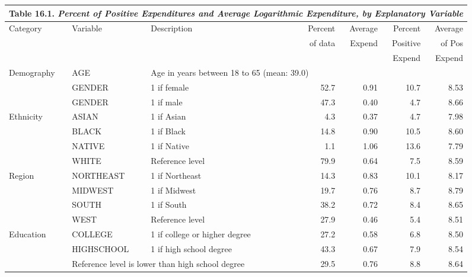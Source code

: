 \clearpage

\begin{table}
\begin{center}
\begin{tabular}{lllrrrr}
\multicolumn{7}{c}{Table 16.1. \textit{Percent of Positive
Expenditures
and Average Logarithmic Expenditure, by Explanatory Variable}} \\
\hline
Category & Variable & Description & Percent & Average & Percent & Average \\
&  &  & of data & \multicolumn{1}{r}{Expend} & \multicolumn{1}{r}{Positive}
& of Pos \\
&  &  &  & \multicolumn{1}{r}{} & \multicolumn{1}{r}{Expend} & Expend \\
\hline Demography &        AGE &  \multicolumn{2}{l}{Age in years
between
18  to 65 (mean: 39.0)}          \\
           &     GENDER & 1 if female &       52.7 &       0.91 &       10.7 &       8.53 \\
           &     GENDER &  1 if male &       47.3 &       0.40 &       4.7 &       8.66 \\
 Ethnicity &      ASIAN & 1 if Asian &        4.3 &       0.37 &        4.7 &       7.98 \\
           &      BLACK & 1 if Black &       14.8 &       0.90 &       10.5 &       8.60 \\
           &     NATIVE & 1 if Native &        1.1 &       1.06 &       13.6 &       7.79 \\
           &      WHITE & Reference level &       79.9 &       0.64 &        7.5 &       8.59 \\
    Region &  NORTHEAST & 1 if Northeast &       14.3 &       0.83 &       10.1 &       8.17 \\
           &    MIDWEST & 1 if Midwest &       19.7 &       0.76 &        8.7 &       8.79 \\
           &      SOUTH & 1 if South &       38.2 &       0.72 &        8.4 &       8.65 \\
           &       WEST & Reference level &       27.9 &       0.46 &        5.4 &       8.51 \\
           \hline
 Education &    COLLEGE & 1 if college or higher degree &       27.2 &       0.58 &        6.8 &       8.50 \\
           & HIGHSCHOOL & 1 if high school degree &       43.3 &       0.67 &        7.9 &       8.54 \\
           &      \multicolumn{2}{l}{Reference level is lower than high school degree} &       29.5 &       0.76 &        8.8 &       8.64 \\

\end{tabular}
\end{center}
\end{table}
